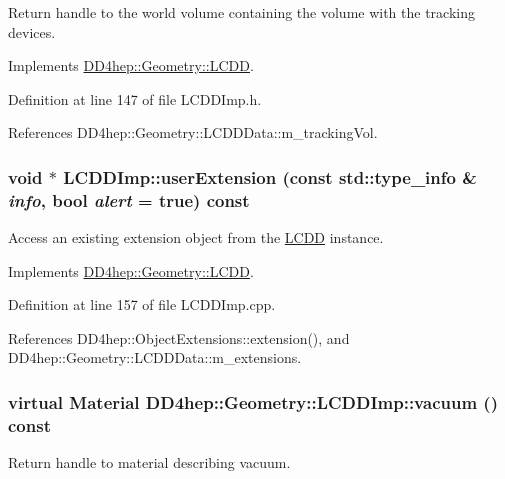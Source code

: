 Return handle to the world volume containing the volume with the tracking devices. 

Implements \hyperlink{class_d_d4hep_1_1_geometry_1_1_l_c_d_d_a351b289056485f960e9121382018c92b}{DD4hep::Geometry::LCDD}.

Definition at line 147 of file LCDDImp.h.

References DD4hep::Geometry::LCDDData::m\_\-trackingVol.\hypertarget{class_d_d4hep_1_1_geometry_1_1_l_c_d_d_imp_adfeb342464586b682c1da99b0c2e023b}{
\subsubsection[{userExtension}]{\setlength{\rightskip}{0pt plus 5cm}void $\ast$ LCDDImp::userExtension (const std::type\_\-info \& {\em info}, \/  bool {\em alert} = {\ttfamily true}) const}}
\label{class_d_d4hep_1_1_geometry_1_1_l_c_d_d_imp_adfeb342464586b682c1da99b0c2e023b}


Access an existing extension object from the \hyperlink{class_d_d4hep_1_1_geometry_1_1_l_c_d_d}{LCDD} instance. 

Implements \hyperlink{class_d_d4hep_1_1_geometry_1_1_l_c_d_d_a699d446afe8b33487cdce57d4e2f26c6}{DD4hep::Geometry::LCDD}.

Definition at line 157 of file LCDDImp.cpp.

References DD4hep::ObjectExtensions::extension(), and DD4hep::Geometry::LCDDData::m\_\-extensions.\hypertarget{class_d_d4hep_1_1_geometry_1_1_l_c_d_d_imp_ac1c1ef94c95b0c6e1d0bd0089a537ebe}{
\subsubsection[{vacuum}]{\setlength{\rightskip}{0pt plus 5cm}virtual {\bf Material} DD4hep::Geometry::LCDDImp::vacuum () const}}
\label{class_d_d4hep_1_1_geometry_1_1_l_c_d_d_imp_ac1c1ef94c95b0c6e1d0bd0089a537ebe}


Return handle to material describing vacuum. 

